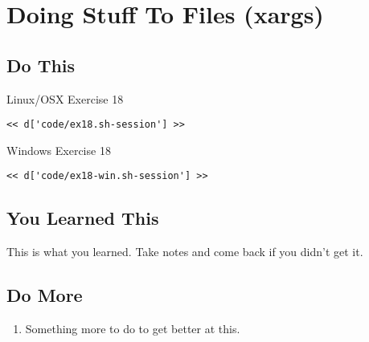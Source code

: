 \chapter{Doing Stuff To Files (xargs)}

\section{Do This}

\begin{code}{Linux/OSX Exercise 18}
\begin{Verbatim}
<< d['code/ex18.sh-session'] >>
\end{Verbatim}
\end{code}

\begin{code}{Windows Exercise 18}
\begin{Verbatim}
<< d['code/ex18-win.sh-session'] >>
\end{Verbatim}
\end{code}

\section{You Learned This}

This is what you learned.  Take notes and come back if you didn't get it.

\section{Do More}

\begin{enumerate}
\item Something more to do to get better at this.
\end{enumerate}

